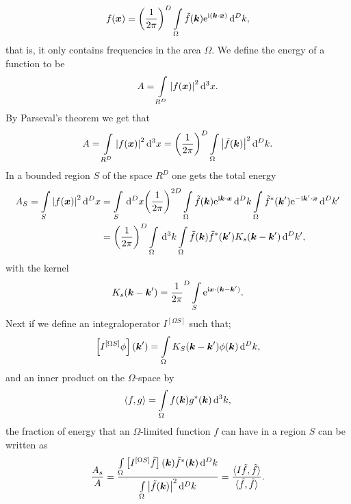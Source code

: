 \documentclass[11pt,a4paper, 
swedish,english %
]{article}
\begin{document}
\begin{equation}
  f(\vb*x)=\qty(\frac{1}{2\pi})^D\int_\Omega \tilde{f}(\vb*k)\ee^{\ii(\vb*k \cdot \vb*x)} \id^Dk,
\end{equation}
that is, it only contains frequencies in the area $\Omega$.
We define the energy of a function to be
\begin{equation*}
A=\int_{R^D}\abs{f(\vb*x)}^2\id^3x.
\end{equation*}
By Parseval's theorem we get that
\begin{equation*}
A=\int_{R^D}\abs{f(\vb*x)}^2\id^3x=\qty(\frac{1}{2\pi})^D \int_\Omega \abs{\tilde{f}(\vb*k)}^2 \id^Dk.
\end{equation*}
In a bounded region $S$ of the space $R^D$ one gets the total energy
\begin{align*}
  A_S=\int_S\abs{f(\vb*x)}^2\id^Dx&=\int_S\id^Dx \qty(\frac{1}{2\pi})^{2D}\int_\Omega \tilde{f}(\vb*k)\ee^{\ii\vb*k\cdot \vb*x}\id^Dk \int_\Omega \tilde{f}^*(\vb*k')\ee^{-\ii\vb*k'\cdot \vb*x}\id^Dk'\\
 & =\qty (\frac{1}{2\pi})^D \int_\Omega\id^3k\int_\Omega\tilde{f}(\vb*k)\tilde{f}^*(\vb*k')K_s(\vb*k-\vb*k')\id^Dk',
\end{align*}
with the kernel
\begin{equation}
  \label{eq:kernel}
K_s(\vb*k-\vb*k')=\frac{1}{2\pi}^D\int_S\ee^{\ii\vb*x \cdot(\vb*k-\vb*k')}.
\end{equation}
Next if we define an integraloperator $I^{[\Omega S]}$ such that;
\begin{equation}
  \label{eq:int_op}
\qty[I^{[\Omega S]}\phi](\vb*k')=\int_\Omega K_S(\vb*k-\vb*k')\phi(\vb*k)\id^Dk,
\end{equation}
and an inner product on the $\Omega$-space by
\begin{equation}
  \label{eq:in_prod}
   \langle f,g\rangle =\int_\Omega f(\vb*k)g^*(\vb*k)\id^3k,
\end{equation}
the fraction of energy that an $\Omega$-limited function $f$ can have in a region $S$ can be written as
\begin{equation}
  \label{eq:energy_frac_final}
\frac{A_s}{A}=\frac{\int_\Omega\qty[I^{[\Omega S]}\tilde{f}](\vb*k)\tilde{f}^*(\vb*k)\id^Dk}{\int_\Omega \abs{\tilde{f}(\vb*k)}^2 \id^Dk}=\frac{ \langle I\tilde{f}, \tilde{f}\rangle}{\langle \tilde{f}, \tilde{f} \rangle}.
\end{equation}
\end{document}
